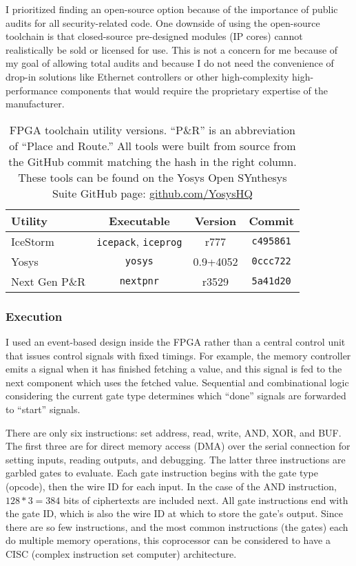 I prioritized finding an open-source option because of the importance of public audits for all security-related code. One downside of using the open-source toolchain is that closed-source pre-designed modules (IP cores) cannot realistically be sold or licensed for use. This is not a concern for me because of my goal of allowing total audits and because I do not need the convenience of drop-in solutions like Ethernet controllers or other high-complexity high-performance components that would require the proprietary expertise of the manufacturer.

\begin{table}[ht]
	\centering
	\begin{tabular}{l c c c}
		\toprule
		Utility       & Executable                         & Version  & Commit \\
		\midrule
		IceStorm      & \texttt{icepack}, \texttt{iceprog} & r777     & \texttt{c495861} \\
		Yosys         & \texttt{yosys}                     & 0.9+4052 & \texttt{0ccc722} \\
		Next Gen P\&R & \texttt{nextpnr}                   & r3529    & \texttt{5a41d20} \\
		\bottomrule
	\end{tabular}
	\caption{FPGA toolchain utility versions. ``P\&R'' is an abbreviation of ``Place and Route.'' All tools were built from source from the GitHub commit matching the hash in the right column. These tools can be found on the Yosys Open SYnthesys Suite GitHub page: \url{github.com/YosysHQ}}%
	\label{tab:versions}
\end{table}

\subsubsection{Execution}

I used an event-based design inside the FPGA rather than a central control unit that issues control signals with fixed timings. For example, the memory controller emits a signal when it has finished fetching a value, and this signal is fed to the next component which uses the fetched value. Sequential and combinational logic considering the current gate type determines which ``done'' signals are forwarded to ``start'' signals.

There are only six instructions: set address, read, write, AND, XOR, and BUF. The first three are for direct memory access (DMA) over the serial connection for setting inputs, reading outputs, and debugging. The latter three instructions are garbled gates to evaluate. Each gate instruction begins with the gate type (opcode), then the wire ID for each input. In the case of the AND instruction, $128*3=384$ bits of ciphertexts are included next. All gate instructions end with the gate ID, which is also the wire ID at which to store the gate's output. Since there are so few instructions, and the most common instructions (the gates) each do multiple memory operations, this coprocessor can be considered to have a CISC (complex instruction set computer) architecture.

